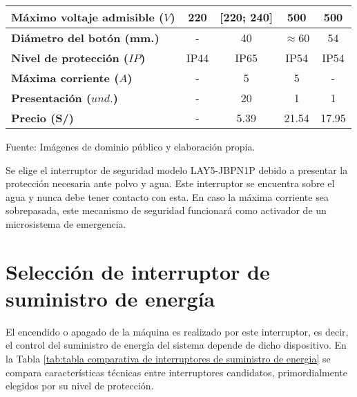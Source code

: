 \begin{mytable}[H]
\begin{tabular}{l|c|c|c|c|}
		\multicolumn{1}{|l|}{
			\begin{minipage}{\myforthmaxsizeofcontenttable}			
				\textbf{Máximo voltaje admisible ($V$)}
			\end{minipage}
		} & 220 & [220; 240] & 500 & 500 \\ \hline
		\multicolumn{1}{|l|}{
			\begin{minipage}{\myforthmaxsizeofcontenttable}			
				\textbf{Diámetro del botón (mm.)}
			\end{minipage}
		} & - & 40 & $\approx$60 & 54 \\ \hline
		\multicolumn{1}{|l|}{\textbf{Nivel de protección ($IP$)}} & IP44 & IP65 & IP54 & IP54 \\ \hline
		\multicolumn{1}{|l|}{\textbf{Máxima corriente ($A$)}} & - & 5 & 5 & - \\ \hline
		\multicolumn{1}{|l|}{\textbf{Presentación ($und.$)}} & - & 20 & 1 & 1 \\ \hline
		\multicolumn{1}{|l|}{\textbf{Precio (S/)}} & - & 5.39 & 21.54 & 17.95 \\ \hline
	\end{tabular}
	\begin{myflushcenteraftertable}	
		Fuente: Imágenes de dominio público y elaboración propia.
	\end{myflushcenteraftertable}
\end{mytable}

Se elige el interruptor de seguridad modelo LAY5-JBPN1P debido a presentar la protección necesaria ante polvo y agua. Este interruptor se encuentra sobre el agua y nunca debe tener contacto con esta. En caso la máxima corriente sea sobrepasada, este mecanismo de seguridad funcionará como activador de un microsistema de  emergencia.

\section{Selección de interruptor de suministro de energía}

El encendido o apagado de la máquina es realizado por este interruptor, es decir, el control del suministro de energía del sistema depende de dicho dispositivo. En la Tabla \ref{tab:tabla comparativa de interruptores de suministro de energia} se compara características técnicas entre interruptores candidatos, primordialmente elegidos por su nivel de protección.

